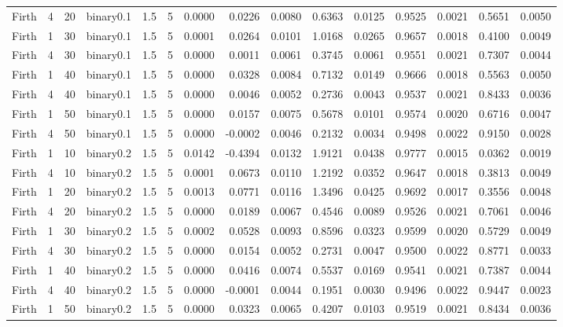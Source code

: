 \begin{longtable}{rrrrrrrrrrrrrrr}
  Firth & 4 & 20 & binary0.1 & 1.5 & 5 & 0.0000 & 0.0226 & 0.0080 & 0.6363 & 0.0125 & 0.9525 & 0.0021 & 0.5651 & 0.0050 \\ 
  Firth & 1 & 30 & binary0.1 & 1.5 & 5 & 0.0001 & 0.0264 & 0.0101 & 1.0168 & 0.0265 & 0.9657 & 0.0018 & 0.4100 & 0.0049 \\ 
  Firth & 4 & 30 & binary0.1 & 1.5 & 5 & 0.0000 & 0.0011 & 0.0061 & 0.3745 & 0.0061 & 0.9551 & 0.0021 & 0.7307 & 0.0044 \\ 
  Firth & 1 & 40 & binary0.1 & 1.5 & 5 & 0.0000 & 0.0328 & 0.0084 & 0.7132 & 0.0149 & 0.9666 & 0.0018 & 0.5563 & 0.0050 \\ 
  Firth & 4 & 40 & binary0.1 & 1.5 & 5 & 0.0000 & 0.0046 & 0.0052 & 0.2736 & 0.0043 & 0.9537 & 0.0021 & 0.8433 & 0.0036 \\ 
  Firth & 1 & 50 & binary0.1 & 1.5 & 5 & 0.0000 & 0.0157 & 0.0075 & 0.5678 & 0.0101 & 0.9574 & 0.0020 & 0.6716 & 0.0047 \\ 
  Firth & 4 & 50 & binary0.1 & 1.5 & 5 & 0.0000 & -0.0002 & 0.0046 & 0.2132 & 0.0034 & 0.9498 & 0.0022 & 0.9150 & 0.0028 \\ 
  Firth & 1 & 10 & binary0.2 & 1.5 & 5 & 0.0142 & -0.4394 & 0.0132 & 1.9121 & 0.0438 & 0.9777 & 0.0015 & 0.0362 & 0.0019 \\ 
  Firth & 4 & 10 & binary0.2 & 1.5 & 5 & 0.0001 & 0.0673 & 0.0110 & 1.2192 & 0.0352 & 0.9647 & 0.0018 & 0.3813 & 0.0049 \\ 
  Firth & 1 & 20 & binary0.2 & 1.5 & 5 & 0.0013 & 0.0771 & 0.0116 & 1.3496 & 0.0425 & 0.9692 & 0.0017 & 0.3556 & 0.0048 \\ 
  Firth & 4 & 20 & binary0.2 & 1.5 & 5 & 0.0000 & 0.0189 & 0.0067 & 0.4546 & 0.0089 & 0.9526 & 0.0021 & 0.7061 & 0.0046 \\ 
  Firth & 1 & 30 & binary0.2 & 1.5 & 5 & 0.0002 & 0.0528 & 0.0093 & 0.8596 & 0.0323 & 0.9599 & 0.0020 & 0.5729 & 0.0049 \\ 
  Firth & 4 & 30 & binary0.2 & 1.5 & 5 & 0.0000 & 0.0154 & 0.0052 & 0.2731 & 0.0047 & 0.9500 & 0.0022 & 0.8771 & 0.0033 \\ 
  Firth & 1 & 40 & binary0.2 & 1.5 & 5 & 0.0000 & 0.0416 & 0.0074 & 0.5537 & 0.0169 & 0.9541 & 0.0021 & 0.7387 & 0.0044 \\ 
  Firth & 4 & 40 & binary0.2 & 1.5 & 5 & 0.0000 & -0.0001 & 0.0044 & 0.1951 & 0.0030 & 0.9496 & 0.0022 & 0.9447 & 0.0023 \\ 
  Firth & 1 & 50 & binary0.2 & 1.5 & 5 & 0.0000 & 0.0323 & 0.0065 & 0.4207 & 0.0103 & 0.9519 & 0.0021 & 0.8434 & 0.0036 \\ 

\end{longtable}
